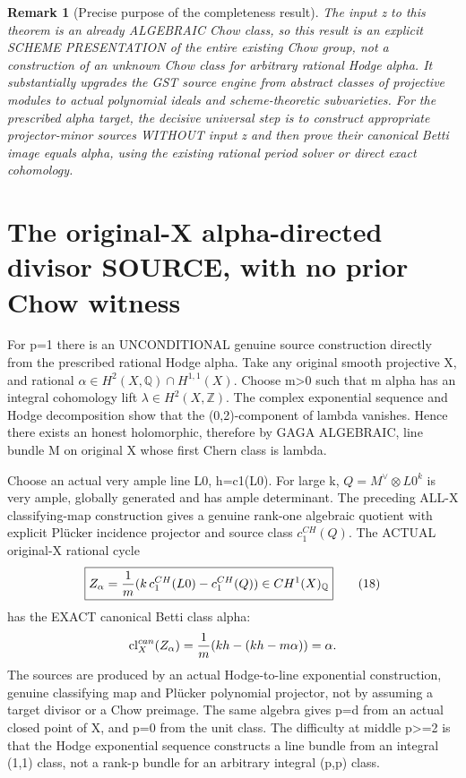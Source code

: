 \documentclass[11pt]{article}
\newtheorem{remark}[theorem]{Remark}
\begin{document}
\begin{remark}[Precise purpose of the completeness result]
The input z to
this theorem is
an already
ALGEBRAIC Chow
class, so this
result is an
explicit SCHEME
PRESENTATION of
the entire existing
Chow group, not
a construction
of an unknown
Chow class for
arbitrary rational
Hodge alpha.
It substantially
upgrades the GST
source engine from
abstract classes
of projective modules
to actual polynomial
ideals and
scheme-theoretic
subvarieties.
For the prescribed
alpha target,
the decisive
universal step is
to construct
appropriate
projector-minor
sources WITHOUT
input z and then
prove their
canonical Betti
image equals alpha,
using the existing
rational period
solver or direct
exact cohomology.
\end{remark}

\section{The original-X alpha-directed divisor SOURCE, with no prior Chow witness}
For p=1 there is
an UNCONDITIONAL
genuine source
construction directly
from the prescribed
rational Hodge alpha.
Take any original
smooth projective X,
and rational
$\alpha\in H^2(X,\mathbb Q)
                 \cap H^{1,1}(X)$.
Choose m>0 such
that m alpha has
an integral
cohomology lift
$\lambda\in H^2(X,\mathbb Z)$.
The complex
exponential
sequence and
Hodge decomposition
show that the
(0,2)-component of
lambda vanishes.
Hence there exists
an honest holomorphic,
therefore by GAGA
ALGEBRAIC, line
bundle M on original
X whose first
Chern class is lambda.

Choose an actual
very ample line
L0, h=c1(L0).
For large k,
$Q=M^\vee\otimes L0^k$
is very ample,
globally generated
and has ample
determinant.
The preceding
ALL-X classifying-map
construction gives
a genuine rank-one
algebraic quotient
with explicit
Pl\"ucker incidence
projector and
source class
$c_1^{CH}(Q)$.
The ACTUAL
original-X rational
cycle
\[
 \boxed{
 Z_\alpha={1\over m}
  (k\,c_1^{CH}(L0)
       -c_1^{CH}(Q))
      \in CH^1(X)_\mathbb Q
 }                                                     \tag{18}
\]
has the EXACT
canonical Betti
class alpha:
\[
 \operatorname{cl}^{can}_X
     (Z_\alpha)
 ={1\over m}
       (kh-(kh-m\alpha))
 =\alpha .
\]
The sources are
produced by
an actual Hodge-to-line
exponential construction,
genuine classifying
map and Pl\"ucker
polynomial projector,
not by assuming
a target divisor
or a Chow preimage.
The same algebra
gives p=d from
an actual closed
point of X, and
p=0 from the
unit class.
The difficulty
at middle p>=2
is that the
Hodge exponential
sequence constructs
a line bundle
from an integral
(1,1) class,
not a rank-p
bundle for an
arbitrary integral
(p,p) class.
\end{document}
